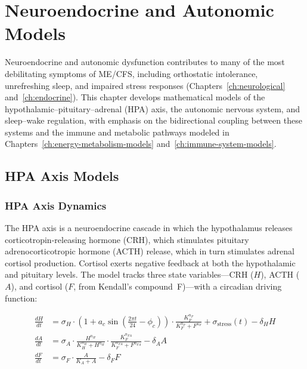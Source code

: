 \chapter{Neuroendocrine and Autonomic Models}
\label{ch:neuroendocrine-models}

Neuroendocrine and autonomic dysfunction contributes to many of the most debilitating symptoms of ME/CFS, including orthostatic intolerance, unrefreshing sleep, and impaired stress responses (Chapters~\ref{ch:neurological} and~\ref{ch:endocrine}). This chapter develops mathematical models of the hypothalamic--pituitary--adrenal (HPA) axis, the autonomic nervous system, and sleep--wake regulation, with emphasis on the bidirectional coupling between these systems and the immune and metabolic pathways modeled in Chapters~\ref{ch:energy-metabolism-models} and~\ref{ch:immune-system-models}.



\section{HPA Axis Models}
\label{sec:hpa-axis-models}

\subsection{HPA Axis Dynamics}
\label{sec:hpa-dynamics}

The HPA axis is a neuroendocrine cascade in which the hypothalamus releases corticotropin-releasing hormone (CRH), which stimulates pituitary adrenocorticotropic hormone (ACTH) release, which in turn stimulates adrenal cortisol production. Cortisol exerts negative feedback at both the hypothalamic and pituitary levels. The model tracks three state variables---CRH ($H$), ACTH ($A$), and cortisol ($F$, from Kendall's compound~F)---with a circadian driving function:

\begin{align}
\label{eq:hpa-axis}
\frac{dH}{dt} &= \sigma_H \cdot \left(1 + a_c \sin\left(\frac{2\pi t}{24} - \phi_c\right)\right) \cdot \frac{K_F^{n_F}}{K_F^{n_F} + F^{n_F}} + \sigma_{\text{stress}}(t) - \delta_H H \\
\frac{dA}{dt} &= \sigma_A \cdot \frac{H^{n_H}}{K_H^{n_H} + H^{n_H}} \cdot \frac{K_F^{n_{FA}}}{K_F^{n_{FA}} + F^{n_{FA}}} - \delta_A A \\
\frac{dF}{dt} &= \sigma_F \cdot \frac{A}{K_A + A} - \delta_F F
\end{align}

